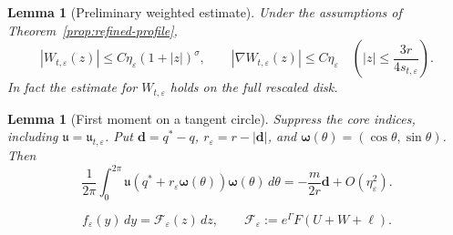 \documentclass[10pt,a4paper]{amsart}
\numberwithin{equation}{section}
\newtheorem{lemma}[theorem]{Lemma}
\theoremstyle{definition}
\theoremstyle{remark}
\newcommand{\eps}{\varepsilon}
\newcommand{\etae}{\eta_{\eps}}
\begin{document}
\setcounter{section}{8}
\setcounter{equation}{9}
\setcounter{theorem}{1}
\begin{lemma}[Preliminary weighted estimate]
\label{lem:preliminary-pointwise}
Under the assumptions of Theorem~\ref{prop:refined-profile},
\begin{equation}\label{eq:preliminary-pointwise}
 |W_{t,\eps}(z)|\le C\etae(1+|z|)^\sigma,
 \qquad |\nabla W_{t,\eps}(z)|\le C\etae
 \quad\left(|z|\le\frac{3r}{4s_{t,\eps}}\right).
\end{equation}
In fact the estimate for $W_{t,\eps}$ holds on the full rescaled disk.
\end{lemma}

\setcounter{section}{8}
\setcounter{equation}{15}
\setcounter{theorem}{2}
\begin{lemma}[First moment on a tangent circle]\label{lem:first-moment}
Suppress the core indices, including $\mathfrak u=\mathfrak u_{t,\eps}$.
Put $\mathbf{d}=q^*-q$, $r_\eps=r-|\mathbf{d}|$, and
$\boldsymbol\omega(\theta)=(\cos\theta,\sin\theta)$.
Then
\begin{equation}\label{eq:first-moment-coarse}
 \frac1{2\pi}\int_0^{2\pi}\mathfrak u(q^*+r_\eps \boldsymbol\omega(\theta))\boldsymbol\omega(\theta)\,d\theta
 =-\frac{m}{2r}\mathbf{d}+O(\etae^2).
\end{equation}
\end{lemma}

\setcounter{section}{8}
\setcounter{equation}{16}
\setcounter{theorem}{3}
\begin{equation}\label{eq:correct-source-change-variable}
 f_\eps(y)\,dy=\mathcal F_\eps(z)\,dz,\qquad
 \mathcal F_\eps:=e^\Gamma F(U+W+\ell).
\end{equation}

\setcounter{section}{8}
\setcounter{equation}{21}
\setcounter{theorem}{3}
\label{app:pointwise-proof}
\end{document}
